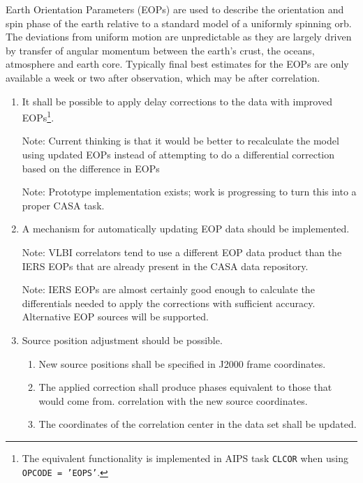 \documentclass[11pt,a4paper]{article}
\begin{document}
Earth Orientation Parameters (EOPs) are used to describe the
orientation and spin phase of the earth relative to a standard model
of a uniformly spinning orb. The deviations from uniform motion are
unpredictable as they are largely driven by transfer of angular
momentum between the earth's crust, the oceans, atmosphere and earth
core. Typically final best estimates for the EOPs are only available a
week or two after observation, which may be after correlation.

\begin{enumerate}[subseclist]

\item It shall be possible to apply delay corrections to the data with
  improved EOPs\footnote{The equivalent functionality is implemented
    in AIPS task \texttt{CLCOR} when using \texttt{OPCODE = 'EOPS'}.}.

  Note: Current thinking is that it would be better to recalculate the
  model using updated EOPs instead of attempting to do a differential
  correction based on the difference in EOPs

  Note: Prototype implementation exists; work is progressing to turn
  this into a proper CASA task.

\item A mechanism for automatically updating EOP data should be
  implemented.

  Note: VLBI correlators tend to use a different EOP data product than
  the IERS EOPs that are already present in the CASA data repository.

  Note: IERS EOPs are almost certainly good enough to calculate the
  differentials needed to apply the corrections with sufficient
  accuracy.  Alternative EOP sources will be supported.

\item Source position adjustment should be possible.

  \begin{enumerate}[subsecsublist]

  \item New source positions shall be specified in J2000 frame coordinates.

  \item The applied correction shall produce phases equivalent to those that would come from.
    correlation with the new source coordinates.

  \item The coordinates of the correlation center in the data set shall be updated.


\end{enumerate}
\end{enumerate}
\end{document}
